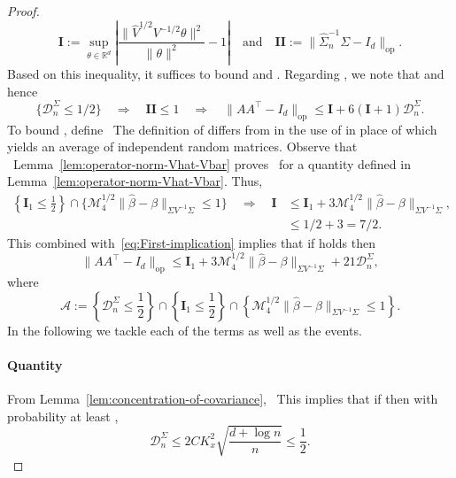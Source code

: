 \documentclass{article}
\begin{document}
\begin{appendices}
\begin{proof}
\begin{equation}
\mathbf{I} := \sup_{\theta\in\mathbb{R}^d}\left|\frac{\|\widehat{V}^{1/2}V^{-1/2}\theta\|^2}{\|\theta\|^2} - 1\right|\quad\mbox{and}\quad \mathbf{II} := \|\widehat{\Sigma}_n^{-1}\Sigma - I_d\|_{\mathrm{op}}.
\end{equation}
Based on this inequality, it suffices to bound   and  .
Regarding  , we note that   and hence
\begin{equation}\label{eq:First-implication}
\{\mathcal{D}_n^{\Sigma} \le 1/2\}\quad\Rightarrow\quad \mathbf{II}\le1\quad\Rightarrow\quad \|AA^{\top} - I_d\|_{\mathrm{op}} \le \mathbf{I} + 6(\mathbf{I} + 1)\mathcal{D}_n^{\Sigma}.
\end{equation} To bound  , define
\ The definition of   differs from   in the use of   in place of   which yields an average of independent random matrices. Observe that
\ Lemma~\ref{lem:operator-norm-Vhat-Vbar} proves
\ for a quantity   defined in Lemma~\ref{lem:operator-norm-Vhat-Vbar}. Thus,
\begin{equation}\label{eq:Second-implication}
\begin{split}
\left\{\mathbf{I}_1 \le \frac{1}{2}\right\}\cap\{\mathcal{M}_4^{1/2}\|\widehat{\beta} - \beta\|_{\Sigma V^{-1}\Sigma} \le 1\}\quad\Rightarrow\quad\mathbf{I} &\le \mathbf{I}_1 + 3\mathcal{M}_4^{1/2}\|\widehat{\beta} - \beta\|_{\Sigma V^{-1}\Sigma},\\ &\le 1/2 + 3 = 7/2.
\end{split}
\end{equation}
This combined with~\eqref{eq:First-implication} implies that if   holds then
\begin{equation}\label{eq:main-decomposition-sandwich}
\|AA^{\top} - I_d\|_{\mathrm{op}} \le \mathbf{I}_1 + 3\mathcal{M}_4^{1/2}\|\widehat{\beta} - \beta\|_{\Sigma V^{-1}\Sigma} + 21\mathcal{D}_n^{\Sigma},
\end{equation}
where
\begin{equation}\label{eq:crucial-event-sandwich}
\mathcal{A} := \left\{\mathcal{D}_n^{\Sigma} \le \frac{1}{2}\right\}\cap\left\{\mathbf{I}_1 \le \frac{1}{2}\right\}\cap\left\{\mathcal{M}_4^{1/2}\|\widehat{\beta} - \beta\|_{\Sigma V^{-1}\Sigma} \le 1\right\}.
\end{equation}
In the following we tackle each of the terms as well as the events.
\paragraph{Quantity  } From Lemma~\ref{lem:concentration-of-covariance},
\ This implies that if   then with probability at least  ,
\begin{equation}\label{eq:quantity-D-Sigma}
\mathcal{D}_n^{\Sigma} \le 2CK_x^2\sqrt{\frac{d + \log n}{n}} \le \frac{1}{2}.
\end{equation}

\end{proof}
\end{appendices}
\end{document}
